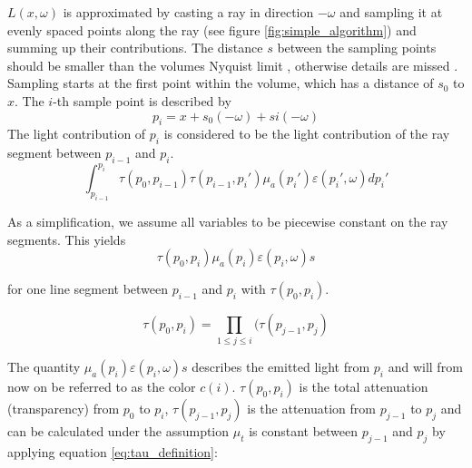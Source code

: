 $L({x},\omega )$ is approximated by casting a ray in direction $-\omega$ and sampling it at evenly spaced points along the ray (see figure \ref{fig:simple_algorithm}) and summing up their contributions\cite{511}. The distance $s$ between the sampling points should be smaller than the volumes Nyquist limit \cite{659497}, otherwise details are missed \cite{10.1145/2661229.2661292}.
Sampling starts at the first point within the volume, which has a distance of $s_0$ to ${x}$. The $i$-th sample point is described by
\begin{equation}
p_i={x} + s_0(-\omega) + si(-\omega)
\end{equation}
The light contribution of $p_i$ is considered to be the light contribution of the ray segment between $p_{i-1}$ and $p_i$.
\begin{equation}
\int_{p_{i-1}}^{p_i} \tau (p_0,p_{i-1}) \tau(p_{i-1},p_{i}') \mu_a(p_{i}')\varepsilon (p_{i}', \omega)dp_{i}'
\end{equation} 



As a simplification, we assume all variables to be piecewise constant\cite{10.1145/147130.147155} on the ray segments. This yields
\begin{equation}
\tau(p_0, p_i) \mu_a(p_{i})\varepsilon (p_{i}, \omega)s
\end{equation} 


for one line segment between $p_{i-1}$ and $p_i$ with $\tau(p_0, p_i)$.


\begin{equation}
\tau(p_0, p_i)=\prod_{1\le j \le i}{(\tau(p_{j-1}, p_j)}
\end{equation} 



The quantity $\mu_a(p_{i})\varepsilon (p_{i}, \omega)s$ describes the emitted light from $p_i$ and will from now on be referred to as the color $c(i)$. $\tau(p_0, p_i)$ is the total attenuation (transparency) from $p_0$ to $p_i$, $\tau(p_{j-1}, p_j)$ is the attenuation from $p_{j-1}$ to $p_j$ and can be calculated under the assumption $\mu_t$ is constant between $p_{j-1}$ and $p_j$ by applying equation \ref{eq:tau_definition}: 


